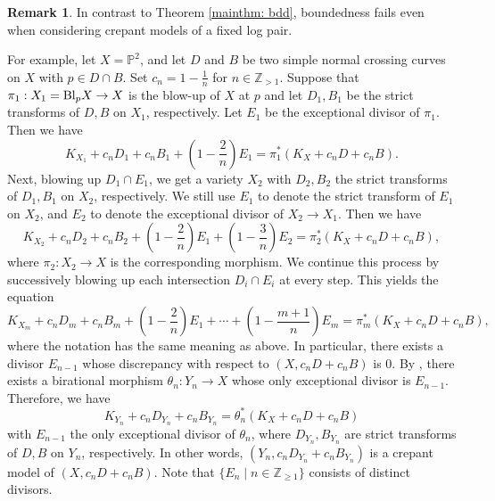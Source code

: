 \documentclass[11pt,oneside,reqno]{amsart}
\numberwithin{equation}{section}
\theoremstyle{definition}
\newtheorem{remark}[proposition]{Remark}
\newcommand{\bP}{\mathbb{P}}
\newcommand{\bZ}{\mathbb{Z}}
\begin{document}
\begin{remark}\label{rem: example}
In contrast to Theorem \ref{mainthm: bdd}, boundedness fails even when considering crepant models of a fixed log pair.

For example, let $X = \bP^2$, and let $D$ and $B$ be two simple normal crossing curves on $X$ with $p \in D \cap B$. Set $c_n = 1 - \frac{1}{n}$ for $n \in \bZ_{>1}$. Suppose that $\pi_1: X_1= {\rm Bl}_p X \to X$ is the blow-up of $X$ at $p$ and let $D_1, B_1$ be the strict transforms of $D, B$ on $X_1$, respectively. Let $E_1$ be the exceptional divisor of $\pi_1$. Then we have
  \[
  K_{X_1}+c_nD_1+c_nB_1+(1-\frac 2 n)E_1=\pi_1^*(K_X+c_nD+c_nB).
  \] Next, blowing up $D_1 \cap E_1$, we get a variety $X_2$ with $D_2, B_2$ the strict transforms of $D_1, B_1$ on $X_2$, respectively. We still use $E_1$ to denote the strict transform of $E_1$ on $X_2$, and $E_2$ to denote the exceptional divisor of $X_2 \to X_1$. Then we have
  \[
  K_{X_2}+c_nD_2+c_nB_2+(1-\frac 2 n)E_1+(1-\frac 3 n)E_2=\pi_2^*(K_X+c_nD+c_nB),
  \] where $\pi_2: X_2 \to X$ is the corresponding morphism. We continue this process by successively blowing up each intersection $D_i \cap E_i$ at every step. This yields the equation
  \[
    K_{X_m}+c_nD_m+c_nB_m+(1-\frac 2 n)E_1+\cdots +(1-\frac{m+1}{n})E_m=\pi_m^*(K_X+c_nD+c_nB),
  \] where the notation has the same meaning as above. In particular, there exists a divisor $E_{n-1}$ whose discrepancy with respect to $(X, c_nD+c_nB)$ is $0$. By \cite[Corollary 1.4.3]{BCHM10}, there exists a birational morphism $\theta_n\colon Y_n \to X$ whose only exceptional divisor is $E_{n-1}$. Therefore, we have
  \[
  K_{Y_n}+c_nD_{Y_n}+c_nB_{Y_n}=\theta_n^*(K_X+c_nD+c_nB) 
  \] with $E_{n-1}$ the only exceptional divisor of $\theta_n$, where $D_{Y_n}, B_{Y_n}$ are strict transforms of $D, B$ on $Y_n$, respectively. In other words, $(Y_n, c_nD_{Y_n}+c_nB_{Y_n})$ is a crepant model of $(X, c_nD+c_nB)$. Note that $\{E_n \mid n \in \bZ_{\geq 1}\}$ consists of distinct divisors. 
  

\end{remark}
\end{document}
